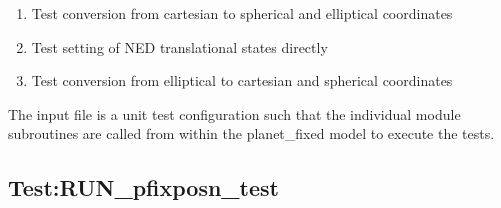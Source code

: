 \documentclass[twoside,11pt,titlepage]{report}
\begin{document}
\begin{enumerate}
\item Test conversion from cartesian to spherical and elliptical coordinates
\item Test setting of NED translational states directly
\item Test conversion from elliptical to cartesian and spherical coordinates
\end{enumerate}

The input file is a unit test configuration such that the individual module subroutines are called
from within the planet\_fixed model to execute the tests.

\subsection{Test:RUN\_pfixposn\_test }\label{pfix}
\end{document}
